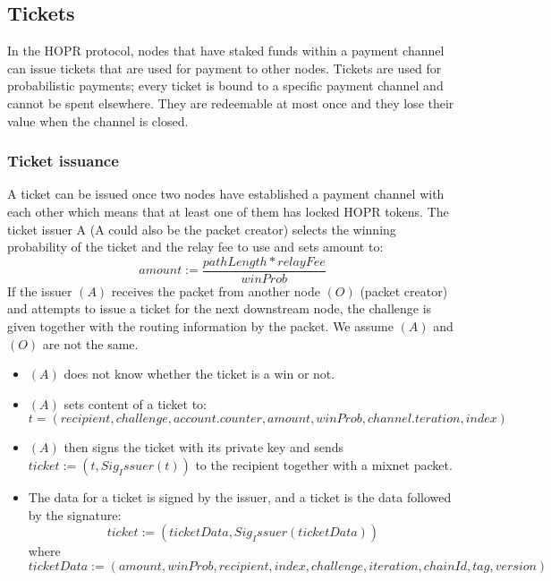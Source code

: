 \subsection{Tickets}
In the HOPR protocol, nodes that have staked funds within a payment channel can issue tickets that are used for payment to other nodes. 
Tickets are used for probabilistic payments; every ticket is bound to a specific payment channel and cannot be spent elsewhere. 
They are redeemable at most once and they lose their value when the channel is closed. 
\subsubsection{Ticket issuance}
A ticket can be issued once two nodes have established a payment channel with each other which means that at least one of them has locked HOPR tokens.
\newline The ticket issuer A (A could also be the packet creator) selects the winning probability of the ticket and the relay fee to use and sets amount to:
$$amount:=\dfrac{pathLength*relayFee}{winProb}$$
If the issuer $(A)$ receives the packet from another node $(O)$ (packet creator) and attempts to issue a ticket for the next downstream node, 
the challenge is given together with the routing information by the packet. We assume $(A)$ and $(O)$ are not the same.
\begin{itemize}
    \item[] $(A)$ does not know whether the ticket is a win or not.
    \item[] $(A)$ sets content of a ticket to: $$t=(recipient, challenge, account.counter, amount, winProb, channel.teration, index)$$ 
    \item[] $(A)$ then signs the ticket with its private key and sends $ticket:= (t, Sig_Issuer(t))$ to the recipient together with a mixnet packet.
    \item[] The data for a ticket is signed by the issuer, and a ticket is the data followed by the signature: $$ticket:=(ticketData,Sig_Issuer(ticketData))$$ where 
    $$ticketData:=(amount,winProb,recipient,index,challenge,iteration,chainId,tag,version)$$
 \end{itemize}
